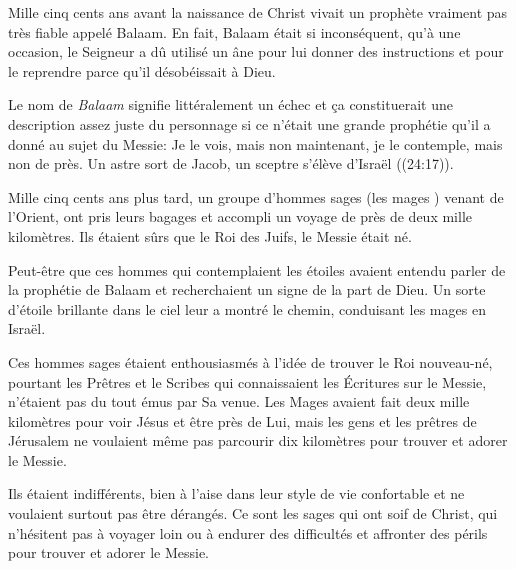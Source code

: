 

Mille cinq cents ans avant la naissance de Christ vivait un prophète vraiment pas très fiable appelé Balaam. En fait, Balaam était si inconséquent, qu'à une occasion, le Seigneur a dû utilisé un âne pour lui donner des instructions et pour le reprendre parce qu'il désobéissait à Dieu.

Le nom de \emph{Balaam} signifie littéralement \og un échec \fg{} et ça constituerait une description assez juste du personnage si ce n'était une grande prophétie qu'il a donné au sujet du Messie: \og Je le vois, mais non maintenant, je le contemple, mais non de près. Un astre sort de Jacob, un sceptre s’élève d’Israël \fg{} ((24:17)).

Mille cinq cents ans plus tard, un groupe d'hommes sages (\og les mages \fg{}) venant de l'Orient, ont pris leurs bagages et accompli un voyage de près de deux mille kilomètres. Ils étaient sûrs que le Roi des Juifs, le Messie était né.

Peut-être que ces hommes qui contemplaient les étoiles avaient entendu parler de la prophétie de Balaam et recherchaient un signe de la part de Dieu. Un sorte d'étoile brillante dans le ciel leur a montré le chemin, conduisant les mages en Israël.

Ces hommes sages étaient enthousiasmés à l'idée de trouver le Roi nouveau-né, pourtant les Prêtres et le Scribes qui connaissaient les Écritures sur le Messie, n'étaient pas du tout émus par Sa venue. Les Mages avaient fait deux mille kilomètres pour voir Jésus et être près de Lui, mais les gens et les prêtres de Jérusalem ne voulaient même pas parcourir dix kilomètres pour trouver et adorer le Messie.

Ils étaient indifférents, bien à l'aise dans leur style de vie confortable et ne voulaient surtout pas être dérangés. Ce sont les sages qui ont soif de Christ, qui n'hésitent pas à voyager loin ou à endurer des difficultés et affronter des périls pour trouver et adorer le Messie.

